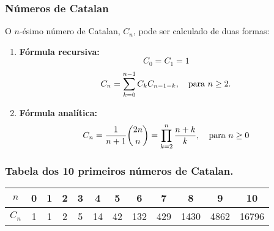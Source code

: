 \subsubsection{Números de Catalan}
O $n$-ésimo número de Catalan, $C_n$, pode ser calculado de duas formas:
\begin{enumerate}
    \item \textbf{Fórmula recursiva:} 
    $$C_0 = C_1 = 1$$
    $$C_n = \sum_{k = 0}^{n-1}C_kC_{n-1-k}, \quad \textnormal{para } n \ge 2.$$

    \item \textbf{Fórmula analítica:}
    $$C_n = \frac{1}{n+1} \binom{2n}{n} = \prod_{k=2}^{n} \frac{n+k}{k}, \quad \textnormal{para } n \ge 0$$
\end{enumerate}

\subsubsection*{Tabela dos 10 primeiros números de Catalan.}
\begin{center}
    \begin{tabular}{c | c c c c c c c c c c c }
        $n$ & 0 &1& 2& 3& 4& 5& 6& 7& 8& 9& 10 \\
        \hline
        $C_n$ & 1& 1& 2& 5& 14& 42& 132& 429& 1430& 4862& 16796 \\
    \end{tabular}
\end{center}

